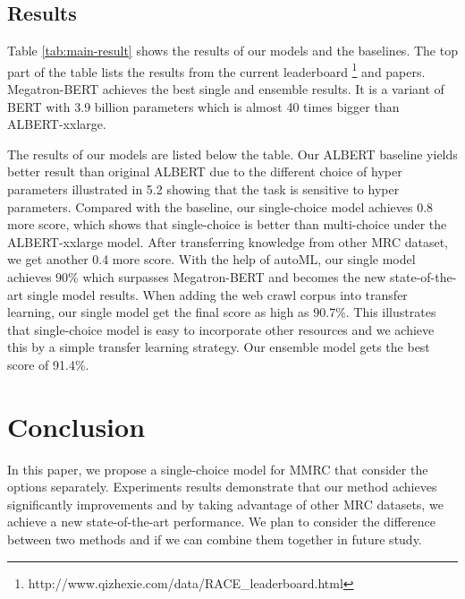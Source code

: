 \documentclass[11pt,a4paper]{article}
\begin{document}
\subsection{Results}

Table \ref{tab:main-result} shows the results of our models and the baselines. The top part of the table lists the results from the current leaderboard \footnote{http://www.qizhexie.com/data/RACE\_leaderboard.html} and papers. Megatron-BERT \cite{shoeybi2019megatron} achieves the best single and ensemble results. It is a variant of BERT\cite{devlin2018bert} with 3.9 billion parameters which is almost 40 times bigger than ALBERT-xxlarge. 

The results of our models are listed below the table. Our ALBERT baseline yields better result than original ALBERT due to the different choice of hyper parameters illustrated in 5.2 showing that the task is sensitive to hyper parameters. Compared with the baseline, our single-choice model achieves 0.8 more score, which shows that single-choice is better than multi-choice under the ALBERT-xxlarge model. After transferring knowledge from other MRC dataset, we get another 0.4 more score. With the help of autoML, our single model achieves 90\% which surpasses Megatron-BERT \cite{shoeybi2019megatron} and becomes the new state-of-the-art single model results. When adding the web crawl corpus into transfer learning, our single model get the final score as high as 90.7\%. This illustrates that single-choice model is easy to incorporate other resources and we achieve this by a simple transfer learning strategy. Our ensemble model gets the best score of 91.4\%. 

\section{Conclusion}
In this paper, we propose a single-choice model for MMRC that consider the options separately. Experiments results demonstrate that our method achieves significantly improvements and by taking advantage of other MRC datasets, we achieve a new state-of-the-art performance. We plan to consider the difference between two methods and if we can combine them together in future study.





\end{document}
